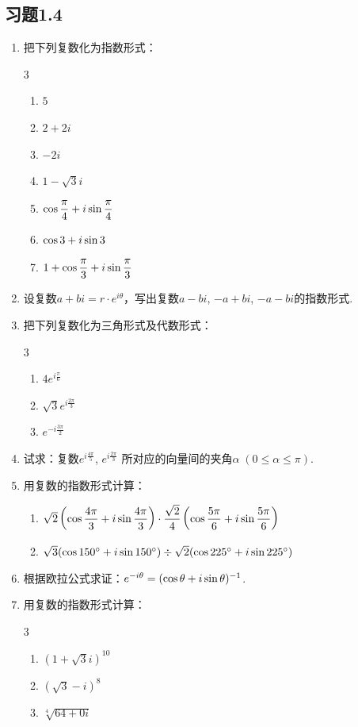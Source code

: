 \subsection*{习题1.4}
\begin{enumerate}
    \item 把下列复数化为指数形式：
\begin{multicols}{3}
\begin{enumerate}[(1)]
    \item $5$
    \item $2+2i$
    \item $-2i$
    \item $1-\sqrt{3}i$
    \item $\cos{\dfrac{\pi}{4}}+i\sin{\dfrac{\pi}{4}}$
    \item $\cos{3}+i\sin{3}$
    \item $1+\cos{\dfrac{\pi}{3}}+i\sin{\dfrac{\pi}{3}}$
\end{enumerate}
\end{multicols}
\item 设复数$a+bi=r\cdot e^{i\theta}$，写出复数$a-bi$, $-a+bi$, $-a-bi$的指数形式.
\item 把下列复数化为三角形式及代数形式：
\begin{multicols}{3}
\begin{enumerate}[(1)]
    \item $4e^{i\tfrac{\pi}{6}}$
    \item $\sqrt{3}e^{i\tfrac{2\pi}{3}}$
    \item $e^{-i\tfrac{3\pi}{2}}$
\end{enumerate}
\end{multicols}

\item 试求：复数$e^{i\tfrac{4\pi}{5}}$, $e^{i\tfrac{2\pi}{3}}$ 所对应的向量间的夹角$\alpha\; (0\le \alpha\le \pi)$.
\item 用复数的指数形式计算：
\begin{enumerate}[(1)]
    \item $\sqrt{2}\left(\cos{\dfrac{4\pi}{3}}+i\sin{\dfrac{4\pi}{3}}\right)\cdot\dfrac{\sqrt{2}}{4}\left(\cos{\dfrac{5\pi}{6}}+i\sin{\dfrac{5\pi}{6}}\right)$
    \item $\sqrt{3}(\cos{150^{\circ}}+i\sin{150^{\circ}})\div \sqrt{2}(\cos{225^{\circ}}+i\sin{225^{\circ}})$
\end{enumerate}

\item 根据欧拉公式求证：$e^{-i\theta}=(\cos{\theta}+i\sin{\theta})^{-1}$.

\item 用复数的指数形式计算：
\begin{multicols}{3}
\begin{enumerate}[(1)]
    \item $(1+\sqrt{3}i)^{10}$
    \item $(\sqrt{3}-i)^8$
    \item $\sqrt[4]{64+0i}$
\end{enumerate}
\end{multicols}


\end{enumerate}
